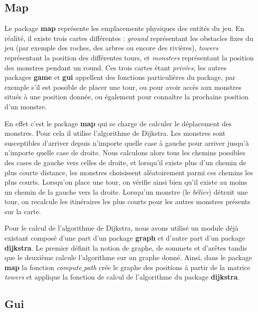 \documentclass{article}
\begin{document}
\subsection{Map}
Le package \textbf{map} représente les emplacements physiques des entités du jeu. En réalité, il existe trois cartes différentes : \textit{ground} représentant les obstacles fixes du jeu (par exemple des roches, des arbres ou encore des rivières), \textit{towers} représentant la position des différentes tours, et \textit{monsters} représentant la position des monstres pendant un round. Ces trois cartes étant \textit{privées}, les autres packages \textbf{game} et \textbf{gui} appellent des fonctions particulières du package, par exemple s'il est possible de placer une tour, ou pour avoir accès aux monstres situés à une position donnée, ou également pour connaître la prochaine position d'un monstre. 
\par
En effet c'est le package \textbf{map} qui se charge de calculer le déplacement des monstres. Pour cela il utilise l'algorithme de Dijkstra. Les monstres sont susceptibles d'arriver depuis n'importe quelle case à gauche pour arriver jusqu'à n'importe quelle case de droite. Nous calculons alors tous les chemins possibles des cases de gauche vers celles de droite, et lorsqu'il existe plus d'un chemin de plus courte distance, les monstres choisissent aléatoirement parmi ces chemins les plus courts. Lorsqu'on place une tour, on vérifie ainsi bien qu'il existe au moins un chemin de la gauche vers la droite. Lorsqu'un monstre (le \textit{bélier}) détruit une tour, on recalcule les itinéraires les plus courts pour les autres monstres présents sur la carte.
\par 
Pour le calcul de l'algorithme de Dijkstra, nous avons utilisé un module déjà existant composé d'une part d'un package \textbf{graph} et d'autre part d'un package \textbf{dijkstra}. Le premier définit la notion de graphe, de sommets et d'arêtes tandis que le deuxième calcule l'algorithme sur un graphe donné. Ainsi, dans le package \textbf{map} la fonction \textit{compute$\_$path} crée le graphe des positions à partir de la matrice \textit{towers} et applique la fonction de calcul de l'algorithme du package \textbf{dijkstra}.


\subsection{Gui}
\end{document}
